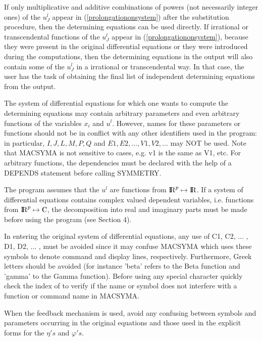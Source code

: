{\pagebreak
If only multiplicative and additive combinations of powers (not necessarily
integer ones) of the $u^{l}_{J}$ appear in (\ref{prolongationonsystem})
after the substitution procedure, then the determining equations can be used 
directly. 
If irrational or transcendental functions of the $u^{l}_{J}$ appear in 
(\ref{prolongationonsystem}), because they were present in the
original differential 
equations or they were introduced during the computations, then the
determining equations in the output will also contain some of the $u^{l}_{J}$
in a irrational or transcendental way. In that case, the user has the task
of obtaining the final list of independent determining equations from the
output.

\nopagebreak
The system of differential equations for which one wants to compute the
determining equations may contain arbitrary parameters and even arbitrary
functions of the variables $x_i$ and $u^l$.  However, names for these 
parameters or functions should not be in conflict
with any other identifiers used in the program: in particular, $I, J, L,
M, P, Q $ and $E1, E2, ... , V1, V2, ... $ may NOT be used. 
Note that MACSYMA is not sensitive to cases, e.g. v1 is the same as V1, etc.
For arbitrary functions, the dependencies must be declared with the help 
of a DEPENDS statement before calling SYMMETRY.

\nopagebreak
The program assumes that the $u^l$ are functions from ${{\rm I\kern-.20em R}}^p \mapsto {\rm I\kern-.20em R}$.
If a system of differential equations contains complex valued dependent
variables, i.e. functions from ${\R}^p \mapsto \C$, the decomposition 
into real and imaginary parts must be made before using the program 
(see Section 4).

In entering the original system of differential equations,
any use of C1, C2, ... , D1, D2, ... , must be avoided since it may 
confuse MACSYMA which uses these symbols to denote command and display lines, 
respectively. Furthermore, Greek letters should be avoided 
(for instance 'beta' refers to the Beta function and
'gamma' to the Gamma function). Before using any special character quickly 
check the index of \cite{macsymamanual,macsymausersguide} to verify
if the name or symbol does not interfere with a function or command name
in MACSYMA.

\nopagebreak
When the feedback mechanism is used, avoid any confusing 
between symbols and parameters occurring in the original equations and those 
used in the explicit forms for the $\eta 's$ and $\varphi 's.$

}
